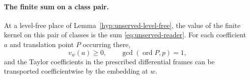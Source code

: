 \paragraph{The finite sum on a class pair.}
\begin{proposition}\label{prop:unserved-reader-integral}
At a level-free place of Lemma~\ref{hyp:unserved-level-free}, the value of the finite kernel on this pair of classes is the sum
\eqref{eq:unserved-reader}. For each coefficient \(a\) and translation point \(P\) occurring there,
\[
 v_w(a)\ge0,\qquad \gcd(\operatorname{ord}P,p)=1,
\]
  and
the Taylor coefficients in the prescribed differential frames
can be transported coefficientwise by the embedding at \(w\).
\end{proposition}


